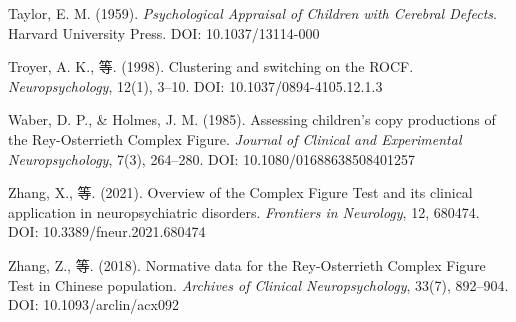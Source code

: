 \documentclass[12pt,a4paper]{ctexart}
\begin{document}
\begin{enumerate}[leftmargin=2em,label={[\arabic*]}]
\item Taylor, E. M. (1959). \textit{Psychological Appraisal of Children with Cerebral Defects}. Harvard University Press. DOI: 10.1037/13114-000

\item Troyer, A. K., 等. (1998). Clustering and switching on the ROCF. \textit{Neuropsychology}, 12(1), 3–10. DOI: 10.1037/0894-4105.12.1.3

\item Waber, D. P., \& Holmes, J. M. (1985). Assessing children's copy productions of the Rey-Osterrieth Complex Figure. \textit{Journal of Clinical and Experimental Neuropsychology}, 7(3), 264–280. DOI: 10.1080/01688638508401257

\item Zhang, X., 等. (2021). Overview of the Complex Figure Test and its clinical application in neuropsychiatric disorders. \textit{Frontiers in Neurology}, 12, 680474. DOI: 10.3389/fneur.2021.680474

\item Zhang, Z., 等. (2018). Normative data for the Rey-Osterrieth Complex Figure Test in Chinese population. \textit{Archives of Clinical Neuropsychology}, 33(7), 892–904. DOI: 10.1093/arclin/acx092

\end{enumerate}
\end{document}
